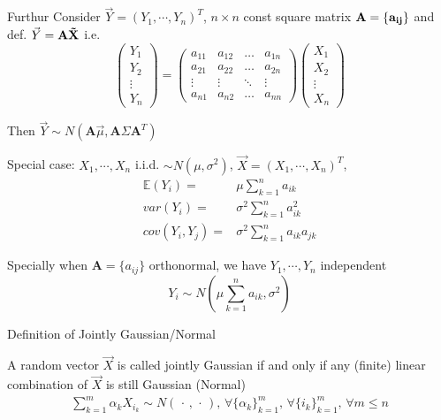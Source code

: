     Furthur Consider $\vec{Y}=(Y_1,\cdots,Y_n)^T$, $n\times n$ const square matrix $\bf{A}=\{a_{ij}\}$ and def. $\vec{Y}=\bf{A}\vec{X}$ i.e.
    \begin{equation}
        \begin{pmatrix}
            Y_1\\
            Y_2\\
            \vdots\\
            Y_n
        \end{pmatrix}
        =
        \begin{pmatrix}
            a_{11}&a_{12}&\ldots&a_{1n}\\
            a_{21}&a_{22}&\ldots&a_{2n}\\
            \vdots&\vdots&\ddots&\vdots\\
            a_{n1}&a_{n2}&\ldots&a_{nn}
        \end{pmatrix}
        \begin{pmatrix}
            X_1\\
            X_2\\
            \vdots\\
            X_n
        \end{pmatrix}
    \end{equation}

    Then $\vec{Y}\sim N(\bm{A}\vec{\mu},\bm{A}\Sigma\bm{A}^T)$

    Special case: $X_1,\cdots,X_n$ i.i.d. $\sim N(\mu,\sigma^2)$, $\vec{X}=(X_1,\cdots,X_n)^T$, 
    \begin{align}
        \mathbb{E}(Y_i)=&\mu\sum_{k=1}^n a_{ik}\\
        var(Y_i)=&\sigma^2\sum_{k=1}^n a_{ik}^2\\
        cov(Y_i,Y_j)=&\sigma^2\sum_{k=1}^n a_{ik} a_{jk}
    \end{align}

    Specially when 
    $\bm{A}=\{a_{ij}\}$ orthonormal, we have $Y_1,\cdots,Y_n$ independent
    \begin{equation}
        Y_i\sim N(\mu\sum_{k=1}^n a_{ik},\sigma^2)    
    \end{equation}

    \begin{point}
        Definition of Jointly Gaussian/Normal
    \end{point}

    A random vector $ \vec{X} $ is called jointly Gaussian if and only if any (finite) linear combination of $ \vec{X} $ is still Gaussian (Normal)
    \begin{align}
        \sum_{k=1}^m\alpha _{k}X_{i_k}\sim N(\, \cdot \, , \, \cdot \, ),\,\forall \{\alpha _k\}_{k=1}^m,\,\forall \{i_k\}_{k=1}^m,\,\forall m\leq n
    \end{align}

